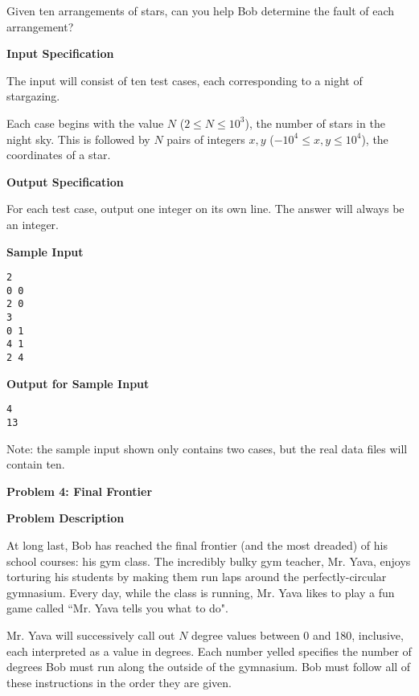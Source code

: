 \documentclass[11pt]{article}
\newcommand{\problem}[2]{\textbf{\Large Problem #1: #2} \vspace{0.4em}}
\newcommand{\heading}[1]{\vspace{0.6em} \textbf{#1}}
\begin{document}
Given ten arrangements of stars, can you help Bob determine the fault of each arrangement?


\heading{Input Specification}

The input will consist of ten test cases, each corresponding to a night of stargazing.

Each case begins with the value $N$ ($2 \le N \le 10^3$), the number of stars in the night sky. This is followed by $N$ pairs of integers $x, y$ ($-10^4 \le x, y \le 10^4$), the coordinates of a star.

\heading{Output Specification}

For each test case, output one integer on its own line. The answer will always be an integer.


\heading{Sample Input}
\vspace{-\topsep}
\begin{verbatim}
2
0 0
2 0
3
0 1
4 1
2 4
\end{verbatim}

\vspace{-\topsep}
\heading{Output for Sample Input}
\vspace{-\topsep}
\begin{verbatim}
4
13
\end{verbatim}

Note: the sample input shown only contains two cases, but the real data files will contain ten.


\pagebreak




\problem{4}{Final Frontier}


\heading{Problem Description}

At long last, Bob has reached the final frontier (and the most dreaded) of his school courses: his gym class. The incredibly bulky gym teacher, Mr. Yava, enjoys torturing his students by making them run laps around the perfectly-circular gymnasium. Every day, while the class is running, Mr. Yava likes to play a fun game called ``Mr. Yava tells you what to do".

Mr. Yava will successively call out $N$ degree values between 0 and 180, inclusive, each interpreted as a value in degrees. Each number yelled specifies the number of degrees Bob must run along the outside of the gymnasium. Bob must follow all of these instructions in the order they are given.
\end{document}
